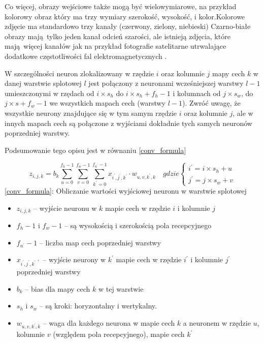 \documentclass{article}
\begin{document}
Co więcej, obrazy wejściowe także mogą być wielowymiarowe, na przykład kolorowy obraz który ma trzy wymiary szerokość, wysokość, i kolor.Kolorowe zdjęcie ma standardowo trzy kanały (czerwony, zielony, niebieski) Czarno-białe obrazy mają tylko jeden kanał odcień szarości, ale istnieją zdjęcia, które mają więcej kanałów jak na przykład fotografie satelitarne utrwalające dodatkowe częstotliwości fal elektromagnetycznych . \cite{geron}

W szczególności neuron zlokalizowany w rzędzie $i$ oraz kolumnie $j$ mapy cech $k$ w danej warstwie splotowej $l$ jest połączony z neuronami wcześniejszej warstwy $l-1$ umieszczonymi w rzędach od $i \times s_{h}$ do $i \times s_{h}+f_{h}-1$ i kolumnach od $j \times s_{w}$, do $j \times s+f_{w}-1$ we wszystkich mapach cech (warstwy $l-1$). Zwróć uwagę, że wszystkie neurony znajdujące się w tym samym rzędzie $i$ oraz kolumnie $j$, ale w innych mapach cech są połączone z wyjściami dokładnie tych samych neuronów poprzedniej warstwy. \cite{geron}

Podsumowanie tego opisu jest w równaniu \ref{conv_formula}
\vspace{1cm}

\begin{center}
	\begin{equation}	
		z_{i,j,k}=b_{k}
		\sum_{u=0}^{f_{h}-1}\sum_{v=0}^{f_{w}-1}\sum_{k^\prime=0}^{f_{n^\prime}-1}
		x_{i^\prime,j^\prime,k^\prime}\cdot w_{u,v,k^\prime,k}
		\quad gdzie \left\{ \begin{array}{ll}
			i^\prime = i \times s_{h}+u\\
			j^\prime = j\times s_{w}+v
		\end{array} \right.
		\label{conv_formula}
	\end{equation}
	\ref{conv_formula}: Obliczanie wartości wyjściowej neuronu w warstwie splotowej
\end{center}

\begin{itemize}
	\item $z_{i,j,k}$ -- wyjście neuronu w $k$ mapie cech w rzędzie $i$ i kolumnie $j$
	\item $f_{h}-1$ i $f_{w}-1$ -- są wysokością i szerokością pola recepcyjnego
	\item $f_{n^\prime}-1$ -- liczba map cech poprzedniej warstwy
	\item $x_{i^\prime,j^\prime,k^\prime}\cdot$ -- wyjście neurony w $k^\prime$ mapie cech w rzędzie $i^\prime$ i kolumnie $j^\prime$ poprzedniej warstwy
	\item $b_{k}$ -- bias dla mapy cech $k$ w tej warstwie
	\item $s_{h}$ i $s_{w}$ -- są kroki: horyzontalny i wertykalny.
	\item $w_{u,v,k^\prime,k}$ -- waga dla każdego neurona w mapie cech $k$ a neuronem w rzędzie $u$, kolumnie $v$ (względem pola recepcyjnego), mapie cech $k^\prime$ 
\end{itemize}
\end{document}
